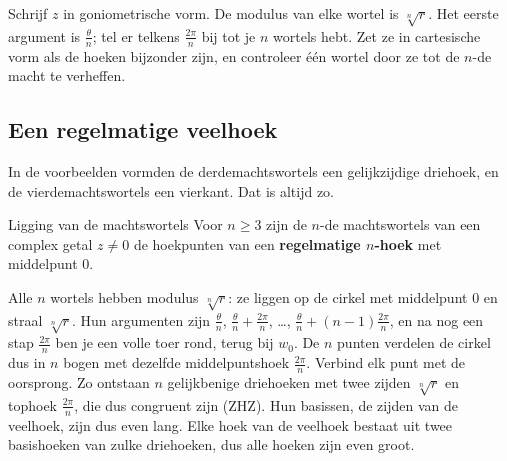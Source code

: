 \begin{werkwijze}
Schrijf $z$ in goniometrische vorm. De modulus van elke wortel is $\sqrt[n]{r}$. Het eerste argument is $\frac{\theta}{n}$; tel er telkens $\frac{2\pi}{n}$ bij tot je $n$ wortels hebt. Zet ze in cartesische vorm als de hoeken bijzonder zijn, en controleer één wortel door ze tot de $n$-de macht te verheffen.
\end{werkwijze}


\begin{oefeningen}


\end{oefeningen}

\subsection{Een regelmatige veelhoek}

In de voorbeelden vormden de derdemachtswortels een gelijkzijdige driehoek, en de vierdemachtswortels een vierkant. Dat is altijd zo.

\begin{theorie}
\begin{stelling}{Ligging van de machtswortels}
Voor $n \geqslant 3$ zijn de $n$-de machtswortels van een complex getal $z \neq 0$ de hoekpunten van een \textbf{\textcolor{accent}{regelmatige $n$-hoek}} met middelpunt 0.
\end{stelling}

\begin{bewijs}
Alle $n$ wortels hebben modulus $\sqrt[n]{r}$: ze liggen op de cirkel met middelpunt 0 en straal $\sqrt[n]{r}$. Hun argumenten zijn $\frac{\theta}{n}$, $\frac{\theta}{n} + \frac{2\pi}{n}$, \ldots, $\frac{\theta}{n} + (n - 1)\frac{2\pi}{n}$, en na nog een stap $\frac{2\pi}{n}$ ben je een volle toer rond, terug bij $w_0$. De $n$ punten verdelen de cirkel dus in $n$ bogen met dezelfde middelpuntshoek $\frac{2\pi}{n}$. Verbind elk punt met de oorsprong. Zo ontstaan $n$ gelijkbenige driehoeken met twee zijden $\sqrt[n]{r}$ en tophoek $\frac{2\pi}{n}$, die dus congruent zijn (ZHZ). Hun basissen, de zijden van de veelhoek, zijn dus even lang. Elke hoek van de veelhoek bestaat uit twee basishoeken van zulke driehoeken, dus alle hoeken zijn even groot.
\end{bewijs}
\end{theorie}

